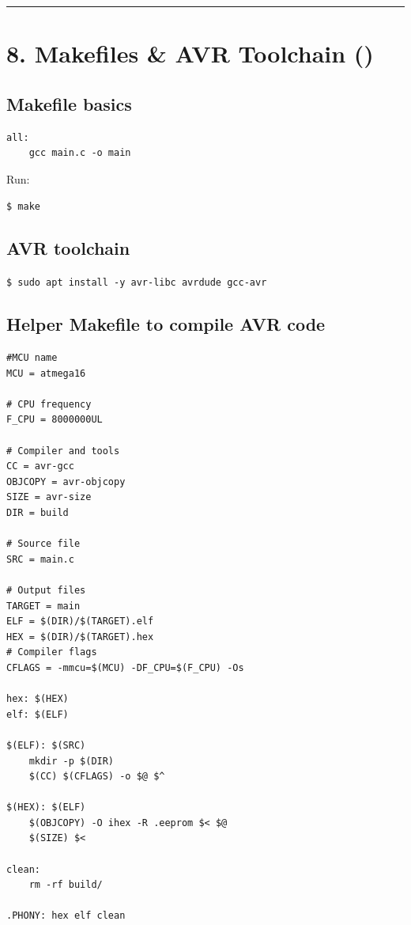 \documentclass[12pt]{article}
\newcommand{\makeicon}{\faFileCode}
\begin{document}
\vspace{1em}
\begin{center}
\color{teamred}\rule{0.8\textwidth}{1pt}
\end{center}

\section*{8. Makefiles \& AVR Toolchain (\makeicon)}

\subsection*{Makefile basics}

\begin{highlightbox}
\begin{verbatim}
all:
    gcc main.c -o main
\end{verbatim}
\end{highlightbox}

Run:

\begin{highlightbox}
\texttt{\$ make}
\end{highlightbox}

\subsection*{AVR toolchain}

\begin{highlightbox}
\texttt{\$ sudo apt install -y avr-libc avrdude gcc-avr}
\end{highlightbox}

\subsection*{Helper Makefile to compile AVR code}

\begin{highlightbox}
\begin{verbatim}
#MCU name
MCU = atmega16

# CPU frequency
F_CPU = 8000000UL

# Compiler and tools
CC = avr-gcc
OBJCOPY = avr-objcopy
SIZE = avr-size
DIR = build

# Source file
SRC = main.c

# Output files
TARGET = main
ELF = $(DIR)/$(TARGET).elf
HEX = $(DIR)/$(TARGET).hex
# Compiler flags
CFLAGS = -mmcu=$(MCU) -DF_CPU=$(F_CPU) -Os

hex: $(HEX)
elf: $(ELF)

$(ELF): $(SRC)
    mkdir -p $(DIR)
    $(CC) $(CFLAGS) -o $@ $^

$(HEX): $(ELF)
    $(OBJCOPY) -O ihex -R .eeprom $< $@
    $(SIZE) $<

clean:
    rm -rf build/

.PHONY: hex elf clean
\end{verbatim}
\end{highlightbox}
\end{document}
